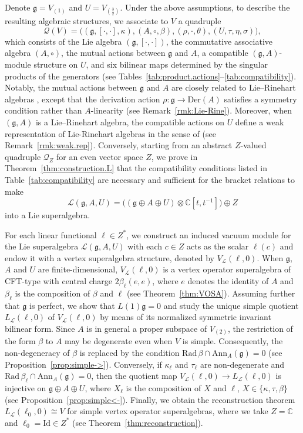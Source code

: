 \documentclass[12pt]{article}
\numberwithin{equation}{section}
\theoremstyle{definition}
\theoremstyle{plain}
\newcommand{\bC}{\ensuremath{\mathbb{C}}}
\newcommand{\Rad}{\mathrm{Rad }}
\newcommand{\Ann}{\mathrm{Ann }}
\newcommand{\fg}{\mathfrak{g}}
\newcommand{\Der}{\mathrm{Der }}
\newcommand{\Id}{\mathrm{Id }}
\newcommand{\cQ}{\ensuremath{\mathcal{Q}}}
\newcommand{\cL}{\ensuremath{\mathcal{L}}}
\begin{document}
Denote $\mathfrak{g}=V_{(1)}$ and $U=V_{(\frac{3}{2})}$. Under the above assumptions, to describe the resulting algebraic structures, we associate to $V$ a quadruple
\[
    \cQ(V)=\big((\fg,[\cdot,\cdot],\kappa),(A,\circ,\beta),(\rho,\cdot,\theta),(U,\tau,\eta,\sigma)\big),
\]
which consists of the Lie algebra $(\fg,[\cdot,\cdot])$, the commutative associative algebra $(A,\circ)$, the mutual actions between $\fg$ and $A$, a compatible $(\fg,A)$-module structure on $U$, and six bilinear maps determined by the singular products of the generators (see Tables~\ref{tab:product.actions}--\ref{tab:compatibility}). Notably, the mutual actions between $\mathfrak{g}$ and $A$ are closely related to Lie--Rinehart algebras \cite{Hue,Rine}, except that the derivation action $\rho:\fg\to\Der(A)$ satisfies a symmetry condition rather than $A$-linearity (see Remark~\ref{rmk:Lie-Rine}). Moreover, when $(\fg,A)$ is a Lie--Rinehart algebra, the compatible actions on $U$ define a weak representation of Lie-Rinehart algebras in the sense of \cite{PSTZ} (see Remark~\ref{rmk:weak.rep}). Conversely, starting from an abstract $Z$-valued quadruple $\mathcal{Q}_Z$ for an even vector space $Z$, we prove in Theorem~\ref{thm:construction.L} that the compatibility conditions listed in Table~\ref{tab:compatibility} are necessary and sufficient for the bracket relations to make
\[
    \cL(\fg,A,U)=\big((\fg\oplus A\oplus U)\otimes\bC[t,t^{-1}]\big)\oplus Z
\]
into a Lie superalgebra.

For each linear functional $\ell\in Z^*$, we construct an induced vacuum module for the Lie superalgebra $\cL(\fg,A,U)$ with each $c\in Z$ acts as the scalar $\ell(c)$ and endow it with a vertex superalgebra structure, denoted by $V_\cL(\ell,0)$. When $\fg$, $A$ and $U$ are finite-dimensional, $V_{\cL}(\ell,0)$ is a vertex operator superalgebra of CFT-type with central charge $2\beta_\ell(e,e)$, where $e$ denotes the identity of $A$ and $\beta_\ell$ is the composition of $\beta$ and $\ell$ (see Theorem~\ref{thm:VOSA}). Assuming further that $\fg$ is perfect, we show that $L(1)\fg=0$ and study the unique simple quotient $L_\cL(\ell,0)$ of $V_{\cL}(\ell,0)$ by means of its normalized symmetric invariant bilinear form. Since $A$ is in general a proper subspace of $V_{(2)}$, the restriction of the form $\beta$ to $A$ may be degenerate even when $V$ is simple. Consequently, the non-degeneracy of $\beta$ is replaced by the condition $\Rad\, \beta\cap \Ann_A(\fg)=0$ (see Proposition~\ref{prop:simple->}). Conversely, if $\kappa_\ell$ and $\tau_\ell$ are non-degenerate and $\Rad\, \beta_\ell\cap \Ann_A(\fg)=0$, then the quotient map $V_\cL(\ell,0)\rightarrow L_\cL(\ell,0)$ is injective on $\fg\oplus A\oplus U$, where $X_\ell$ is the composition of $X$ and $\ell$, $X\in\{\kappa,\tau,\beta\}$ (see Proposition~\ref{prop:simple<-}). Finally, we obtain the reconstruction theorem $L_\cL(\ell_0,0)\cong V$ for simple vertex operator superalgebras, where we take $Z=\bC$ and $\ell_0=\Id\in Z^*$ (see Theorem~\ref{thm:reconstruction}).
\end{document}
